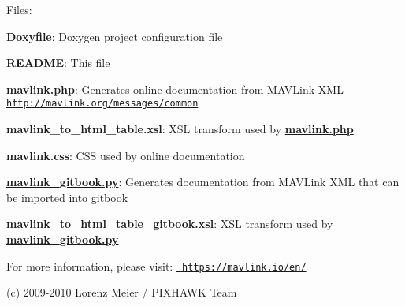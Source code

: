 Files\+:


\begin{DoxyItemize}
\item {\bfseries{Doxyfile}}\+: Doxygen project configuration file
\item {\bfseries{R\+E\+A\+D\+ME}}\+: This file
\item {\bfseries{\mbox{\hyperlink{mavlink_8php}{mavlink.\+php}}}}\+: Generates online documentation from M\+A\+V\+Link X\+ML -\/ \href{http://mavlink.org/messages/common}{\texttt{ http\+://mavlink.\+org/messages/common}}
\begin{DoxyItemize}
\item {\bfseries{mavlink\+\_\+to\+\_\+html\+\_\+table.\+xsl}}\+: X\+SL transform used by {\bfseries{\mbox{\hyperlink{mavlink_8php}{mavlink.\+php}}}}
\item {\bfseries{mavlink.\+css}}\+: C\+SS used by online documentation
\end{DoxyItemize}
\item {\bfseries{\mbox{\hyperlink{mavlink__gitbook_8py}{mavlink\+\_\+gitbook.\+py}}}}\+: Generates documentation from M\+A\+V\+Link X\+ML that can be imported into gitbook
\begin{DoxyItemize}
\item {\bfseries{mavlink\+\_\+to\+\_\+html\+\_\+table\+\_\+gitbook.\+xsl}}\+: X\+SL transform used by {\bfseries{\mbox{\hyperlink{mavlink__gitbook_8py}{mavlink\+\_\+gitbook.\+py}}}}
\end{DoxyItemize}
\end{DoxyItemize}

For more information, please visit\+: \href{https://mavlink.io/en/}{\texttt{ https\+://mavlink.\+io/en/}}

(c) 2009-\/2010 Lorenz Meier / P\+I\+X\+H\+A\+WK Team 
